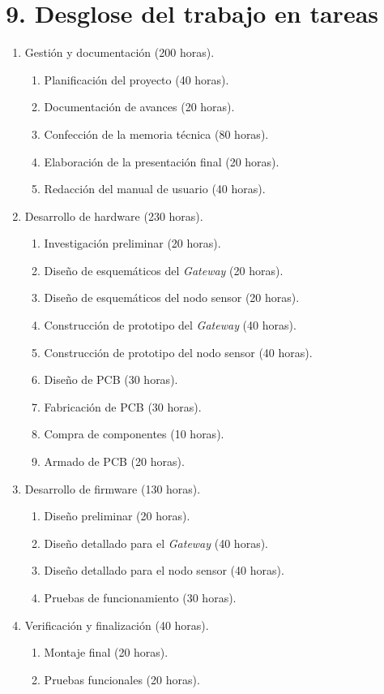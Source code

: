 \documentclass[
11pt, %
]{charter}
\begin{document}
\section{9. Desglose del trabajo en tareas}
\label{sec:wbs}


\begin{enumerate}
\item Gestión y documentación (200 horas).
	\begin{enumerate}
	\item Planificación del proyecto (40 horas).
	\item Documentación de avances (20 horas).
	\item Confección de la memoria técnica (80 horas).
	\item Elaboración de la presentación final (20 horas).
	\item Redacción del manual de usuario (40 horas).
	\end{enumerate}
\item Desarrollo de hardware (230 horas).
	\begin{enumerate}
	\item Investigación preliminar (20 horas).
	\item Diseño de esquemáticos del \textit{Gateway} (20 horas).
	\item Diseño de esquemáticos del nodo sensor (20 horas).
	\item Construcción de prototipo del \textit{Gateway} (40 horas).
	\item Construcción de prototipo del nodo sensor (40 horas).
	\item Diseño de PCB (30 horas).
	\item Fabricación de PCB (30 horas).
	\item Compra de componentes (10 horas).
	\item Armado de PCB (20 horas).
	\end{enumerate}
\item Desarrollo de firmware (130 horas).
	\begin{enumerate}
	\item Diseño preliminar (20 horas).
	\item Diseño detallado para el \textit{Gateway} (40 horas).
	\item Diseño detallado para el nodo sensor (40 horas).
	\item Pruebas de funcionamiento (30 horas).
	\end{enumerate}
\item Verificación y finalización (40 horas).
	\begin{enumerate}
	\item Montaje final (20 horas).
	\item Pruebas funcionales (20 horas).
	\end{enumerate}
\end{enumerate}
\end{document}

